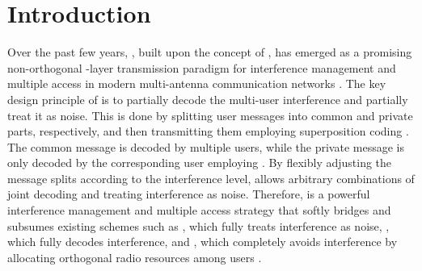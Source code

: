 \documentclass[a4paper,10pt,journal]{IEEEtran}
\begin{document}
\section{Introduction}
Over the past few years, , built upon the concept of ,  has emerged as a promising non-orthogonal -layer transmission paradigm for interference management and multiple access in modern multi-antenna communication networks \cite{RSintro16bruno,mao2017eurasip,mao2019beyondDPC}. 
The key design principle of  is to partially decode the multi-user interference and partially treat it as noise. This is done by splitting user messages into common and private parts, respectively, and then transmitting them employing superposition coding \cite{mao2022survey}. 
The common message is decoded by multiple users, while the private message is only decoded by the corresponding user employing .
By flexibly adjusting the message splits according to the interference level,  allows arbitrary combinations of joint decoding and treating interference as noise. 
Therefore,  is a powerful interference management  and multiple access strategy that softly bridges and subsumes existing schemes such as , which fully treats interference as noise,  , which fully decodes interference, and , which completely avoids interference by allocating orthogonal radio resources among users \cite{mao2017eurasip, bruno2019wcl}.
\end{document}
